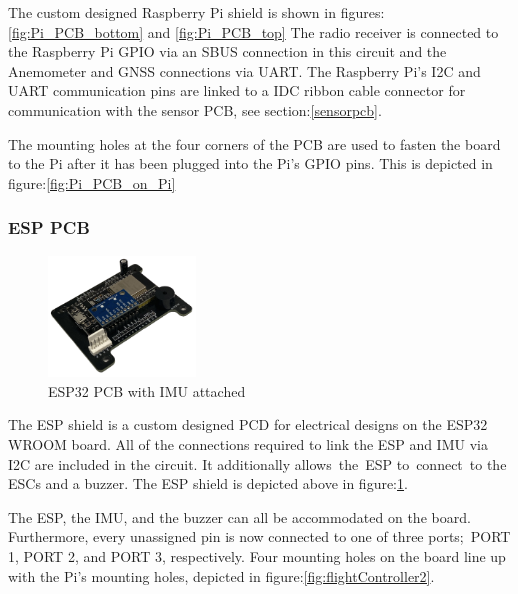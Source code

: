 \documentclass{article}
\begin{document}
The custom designed Raspberry Pi shield is shown in
figures:\ref{fig:Pi_PCB_bottom} and \ref{fig:Pi_PCB_top} The radio receiver is
connected to the Raspberry Pi GPIO via an SBUS connection in this circuit and
the Anemometer and GNSS connections via UART. The Raspberry Pi's I2C and UART
communication pins are linked to a IDC ribbon cable connector for communication
with the sensor PCB, see section:\ref{sensorpcb}.

The mounting holes at the four corners of the PCB are used to fasten the board
to the Pi after it has been plugged into the Pi's GPIO pins. This is depicted in
figure:\ref{fig:Pi_PCB_on_Pi}

\subsubsection{ESP PCB}
\begin{figure}[H]
  \centering
  \includegraphics[width=0.35\textwidth]{Pictures/Esp_IMU_board.png}
  \caption{ESP32 PCB with IMU attached}
  \label{fig:Esp_IMU_PCB}
\end{figure}
The ESP shield is a custom designed PCD for electrical designs on the ESP32
WROOM board. All of the connections required to link the ESP and IMU via I2C are
included in the circuit. It additionally allows the ESP to connect to the ESCs
and a buzzer. The ESP shield is depicted above in figure:\ref{fig:Esp_IMU_PCB}.

The ESP, the IMU, and the buzzer can all be accommodated on the board.
Furthermore, every unassigned pin is now connected to one of three ports; PORT
1, PORT 2, and PORT 3, respectively. Four mounting holes on the board line up
with the Pi's mounting holes, depicted in figure:\ref{fig:flightController2}.
\end{document}
